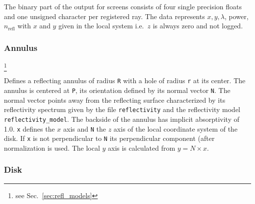 \documentclass[10pt,a4paper,titlepage]{article}
\begin{document}
The binary part of the output for screens consists of four single precision floats and one unsigned character per registered ray. The data represents $x, y, \lambda$, power, $n_{\mathrm{refl}}$ with $x$ and $y$ given in the local system i.e.\ $z$ is always zero and not logged.


\subsubsection{Annulus}









\footnote{see Sec.~\ref{sec:refl_models}}

\vspace{0.25cm}
Defines a reflecting annulus of radius {\tt R} with a hole of radius {\tt r} at its center. The annulus is centered at {\tt P}, its orientation defined by its normal vector {\tt N}. The normal vector points away from the reflecting surface characterized by its reflectivity spectrum given by the file {\tt reflectivity} and the reflectivity model {\tt reflectivity\_model}. The backside of the annulus has implicit absorptivity of 1.0. {\tt x} defines the $x$ axis and {\tt N} the $z$ axis of the local coordinate system of the disk. If {\tt x} is not perpendicular to {\tt N} its perpendicular component (after normalization is used. The local $y$ axis is calculated from $y = N \times x$.

\subsubsection{Disk}





\end{document}
